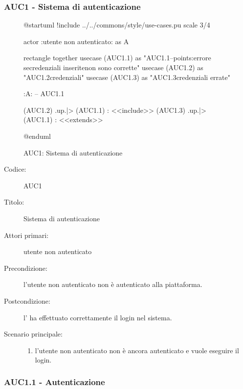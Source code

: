 \documentclass[casi-duso]{subfiles}
\begin{document}
\subsubsection{AUC1 - Sistema di autenticazione}%
\label{subsub:AUC1}

\begin{figure}[h!] 
  \centering 
  \begin{plantuml}
  @startuml
  !include ../../commons/style/use-cases.pu
  scale 3/4

  actor :utente non autenticato: as A

  rectangle {
    together {
      usecase (AUC1.1) as "AUC1.1\nAutenticazione\n--\nExtension points:\nVisualizzazione errore se\nle credenziali inserite\n non sono corrette"
      usecase (AUC1.2) as "AUC1.2\nVerifica credenziali"
      usecase (AUC1.3) as "AUC1.3\nVisualizzazione credenziali errate"
    }
  }

  :A: -- AUC1.1

  (AUC1.2) .up.|> (AUC1.1) : <<include>>
  (AUC1.3) .up.|> (AUC1.1) : <<extends>>

  @enduml
  \end{plantuml} 
  \caption{AUC1: Sistema di autenticazione} 
  \label{fig:auc1} 
\end{figure}

\begin{description}
  \item[Codice:] AUC1
  \item[Titolo:] Sistema di autenticazione
  \item[Attori primari:] utente non autenticato
  \item[Precondizione:] l'utente non autenticato non è autenticato alla piattaforma.
  \item[Postcondizione:] l' ha effettuato correttamente il login nel sistema.
  \item[Scenario principale:]
  \begin{enumerate}
    \item l'utente non autenticato non è ancora autenticato e vuole eseguire il login.
  \end{enumerate}
\end{description}

\subsubsection{AUC1.1 - Autenticazione}%
\label{subsub:AUC1.1}
\end{document}
